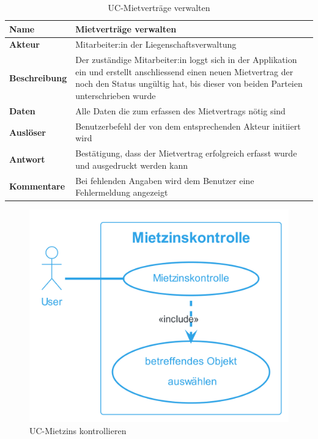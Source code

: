 \vspace*{-1cm}

  \begin{table}[H]
    \centering
    \settowidth{}
    \setlength\extrarowheight{2pt}
      \begin{tabulary}{1.0\textwidth}{|a|m{14cm}|}
        \hline
        \textbf{Name}& Mietverträge verwalten\\
      \hline
      \textbf{Akteur}& Mitarbeiter:in der Liegenschaftsverwaltung\\
      \hline 
      \textbf{Beschreibung} & Der zuständige Mitarbeiter:in loggt sich in der Applikation ein und erstellt anschliessend einen neuen Mietvertrag der noch den Status ungültig hat, bis dieser von beiden Parteien unterschrieben wurde\\
      \hline
      \textbf{Daten} & Alle Daten die zum erfassen des Mietvertrags nötig sind \\
      \hline
      \textbf{Auslöser} & Benutzerbefehl der von dem entsprechenden Akteur initiiert wird\\
      \hline
      \textbf{Antwort} & Bestätigung, dass der Mietvertrag erfolgreich erfasst wurde und ausgedruckt werden kann\\
      \hline
      \textbf{Kommentare} & Bei fehlenden Angaben wird dem Benutzer eine Fehlermeldung angezeigt\\
      \hline
  \end{tabulary}
  \caption{UC-Mietverträge verwalten}
  \end{table}

\begin{figure}[H]
  \begin{center}
    \includegraphics[width=0.4\linewidth]{content/diagrams/out/usecase/mietzinsKontrollieren/MietzinsKontrollieren.png}
    \caption{UC-Mietzins kontrollieren}
    \label{MietzinsKontrollieren}
  \end{center}
\end{figure}

